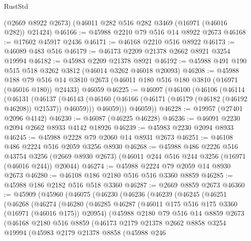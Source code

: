 \begin{lexlean}{RustStd}
\begin{coremodule}
    (@2669 @8922 @2673)
    (@46011 @282 @516 @282 @3469 (@16971 (@46016 @282)) @21424)
@46166 := @45988 @2210 @79 @516 @14 @8922 @2673
@46168 := @17602 @45917 @2436
@46171 := @46168 @2210 @516 @8922
@46173 := @46089 @483 @516
@46179 := @46173 @2209 @21378 @2662 @8921 @3254 @19994
@46182 := @45983 @2209 @21378 @8921
@46192 := @45988 @491 @190 @515 @518 @3262 @3812 (@46014 @3262 @46018 @20093)
@46208 := @45988
    @188
    @79
    @516
    @14
    @3810
    @2673
    (@46011 @180 @516 @180 @3810 (@16971 (@46016 @180)) @24433)
    @46059
@46225 := @46097
    (@46100
      (@46106
        (@46114
          (@46131
            (@46137
              (@46143 (@46160 (@46166 (@46171 (@46179 (@46182 (@46192 @46208)) @21537)) @46059)))
              @46059)))
        @46059))
@46228 := @19957 (@27401 @2096 @4142)
@46230 := @46087 (@46225 @46228)
@46236 := @46091 @2230 @2094 @2662 @8933 @4142 @18926
@46239 := @45983 @2230 @2094 @8933
@46245 := @45988 @2228 @79 @2060 @14 @8931 @2673
@46251 := @46108 @486 @2224 @516 @2059 @3256 @8930
@46268 := @45988
    @486
    @2226
    @516
    @43754
    @3256
    (@2669 @8930 @2673)
    (@46011 @244 @516 @244 @3256 (@16971 (@46016 @244)) @20044)
@46274 := @45988 @2224 @79 @2059 @14 @8930 @2673
@46280 := @46108 @186 @2180 @516 @516 @3360 @8859
@46285 := @45988 @186 @2182 @516 @518 @3360
@46287 := @2669 @8859 @2673
@46360 := @45909
    (@45960
      (@46075
        (@46230
          (@46236
            (@46239
              (@46245
                (@46251
                  (@46268
                    (@46274
                      (@46280
                        (@46285
                          @46287
                          (@46011 @175 @516 @175 @3360 (@16971 (@46016 @175)) @20954)
                          (@45988
                            @2180
                            @79
                            @516
                            @14
                            @8859
                            @2673
                            (@46168
                              @2180
                              @516
                              @8859
                              (@46173
                                @2179
                                @21378
                                @2662
                                @8858
                                @3254
                                @19994
                                (@45983
                                  @2179
                                  @21378
                                  @8858
                                  (@45988
                                    @246

\end{coremodule}
\end{lexlean}
